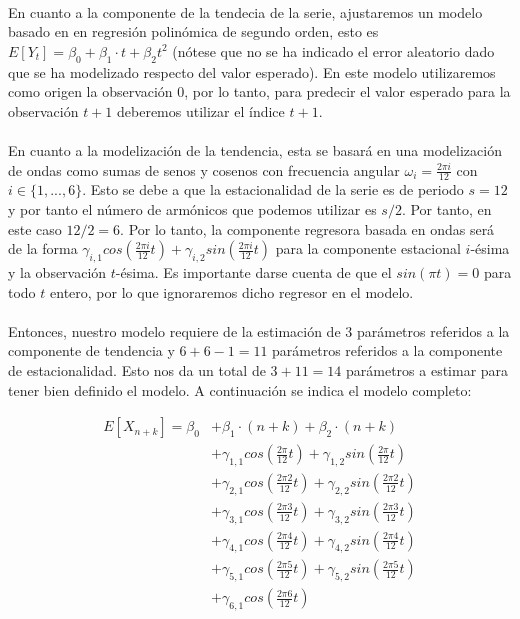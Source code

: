 \documentclass[a4paper, spanish]{article}
\begin{document}
    \paragraph{}
    En cuanto a la componente de la tendecia de la serie, ajustaremos un modelo basado en en regresión polinómica de segundo orden, esto es $E[Y_t] = \beta_0 + \beta_1 \cdot t + \beta_2 t ^ 2$ (nótese que no se ha indicado el error aleatorio dado que se ha modelizado respecto del valor esperado). En este modelo utilizaremos como origen la observación $0$, por lo tanto, para predecir el valor esperado para la observación $t + 1$ deberemos utilizar el índice $t + 1$.

    \paragraph{}
    En cuanto a la modelización de la tendencia, esta se basará en una modelización de ondas como sumas de senos y cosenos con frecuencia angular $\omega_i = \frac{2 \pi i}{12}$ con $i \in \{1, ..., 6\}$. Esto se debe a que la estacionalidad de la serie es de periodo $s = 12$ y por tanto el número de armónicos que podemos utilizar es $s / 2$. Por tanto, en este caso $12 / 2 = 6$. Por lo tanto, la componente regresora basada en ondas será de la forma $\gamma_{i,1} cos\left(\frac{2 \pi  i}{12} t\right) + \gamma_{i,2} sin\left(\frac{2 \pi i}{12} t\right)$ para la componente estacional $i$-ésima y la observación $t$-ésima. Es importante darse cuenta de que el $sin(\pi t) = 0$ para todo $t$ entero, por lo que ignoraremos dicho regresor en el modelo.

    \paragraph{}
    Entonces, nuestro modelo requiere de la estimación de $3$ parámetros referidos a la componente de tendencia y $6 + 6 -1 = 11$ parámetros referidos a la componente de estacionalidad. Esto nos da un total de $3 + 11 = 14$ parámetros a estimar para tener bien definido el modelo. A continuación se indica el modelo completo:

    \begin{align*}
      E[X_{n + k}] = \beta_0 &+ \beta_1 \cdot (n + k) + \beta_2 \cdot(n + k) \\
      &+ \gamma_{1,1} cos\left(\frac{2 \pi  }{12} t\right) + \gamma_{1,2} sin\left(\frac{2 \pi  }{12} t\right) \\
      &+ \gamma_{2,1} cos\left(\frac{2 \pi 2}{12} t\right) + \gamma_{2,2} sin\left(\frac{2 \pi 2}{12} t\right) \\
      &+ \gamma_{3,1} cos\left(\frac{2 \pi 3}{12} t\right) + \gamma_{3,2} sin\left(\frac{2 \pi 3}{12} t\right) \\
      &+ \gamma_{4,1} cos\left(\frac{2 \pi 4}{12} t\right) + \gamma_{4,2} sin\left(\frac{2 \pi 4}{12} t\right) \\
      &+ \gamma_{5,1} cos\left(\frac{2 \pi 5}{12} t\right) + \gamma_{5,2} sin\left(\frac{2 \pi 5}{12} t\right) \\
      &+ \gamma_{6,1} cos\left(\frac{2 \pi 6}{12} t\right)
    \end{align*}
\end{document}
